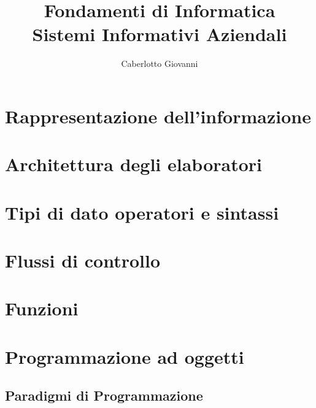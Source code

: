 \documentclass{report}
\title{\Huge{Fondamenti di Informatica}\\Sistemi Informativi Aziendali}
\author{\huge{Caberlotto Giovanni}}
\date{}
\begin{document}
\maketitle
\newpage%
\tableofcontents
\pagebreak

\chapter{Rappresentazione dell'informazione} %
\label{chap:Rappresentazione dell'informazione}


\chapter{Architettura degli elaboratori} %
\label{chap:Architettura degli elaboratori}


\chapter{Tipi di dato operatori e sintassi} %
\label{chap:Tipi di dato operatori e sintassi}


\chapter{Flussi di controllo} %
\label{chap:Flussi di controllo}


\chapter{Funzioni} %
\label{chap:Funzioni}


\chapter{Programmazione ad oggetti} %
\label{chap:Programmazione ad oggetti}

\section{Paradigmi di Programmazione}
\end{document}
